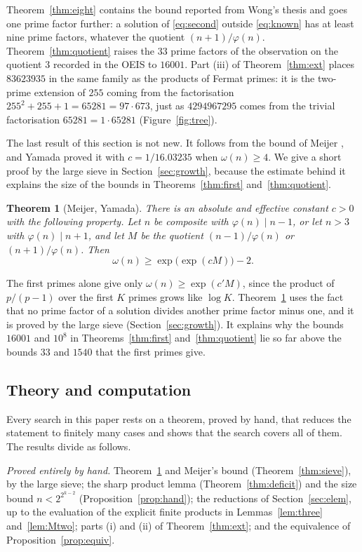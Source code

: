\documentclass[11pt,reqno]{amsart}
\numberwithin{equation}{section}
\theoremstyle{plain}
\newtheorem{theorem}{Theorem}[section]
\theoremstyle{definition}
\theoremstyle{remark}
\begin{document}
Theorem~\ref{thm:eight} contains the bound reported from Wong's
thesis and goes one prime factor further: a solution of
\eqref{eq:second} outside \eqref{eq:known} has at least nine prime
factors, whatever the quotient $(n+1)/\varphi(n)$. Theorem~\ref{thm:quotient}
raises the $33$ prime factors of the observation on the quotient $3$
recorded in the OEIS to $16001$. Part (iii) of
Theorem~\ref{thm:ext} places $83623935$ in the same family as the
products of Fermat primes: it is the two-prime extension of $255$
coming from the factorisation $255^2+255+1=65281=97\cdot673$, just as
$4294967295$ comes from the trivial factorisation $65281=1\cdot65281$
(Figure~\ref{fig:tree}).

The last result of this section is not new. It follows from the bound
of Meijer \cite{Mei74}, and Yamada \cite{Yam23} proved it with
$c=1/16.03235$ when $\omega(n)\ge4$. We give a short proof by the
large sieve in Section~\ref{sec:growth}, because the estimate behind it
explains the size of the bounds in Theorems~\ref{thm:first}
and~\ref{thm:quotient}.

\begin{theorem}[Meijer, Yamada]\label{thm:doubly}
There is an absolute and effective constant $c>0$ with the following
property. Let $n$ be composite with $\varphi(n)\mid n-1$, or let $n>3$
with $\varphi(n)\mid n+1$, and let $M$ be the quotient
$(n-1)/\varphi(n)$ or $(n+1)/\varphi(n)$. Then
\[
  \omega(n)\ge\exp\bigl(\exp(cM)\bigr)-2 .
\]
\end{theorem}

The first primes alone give only $\omega(n)\ge\exp(c'M)$, since the
product of $p/(p-1)$ over the first $K$ primes grows like $\log K$.
Theorem~\ref{thm:doubly} uses the fact that no prime factor of a
solution divides another prime factor minus one, and it is proved by
the large sieve (Section~\ref{sec:growth}). It explains why the bounds
$16001$ and $10^8$ in Theorems~\ref{thm:first} and~\ref{thm:quotient}
lie so far above the bounds $33$ and $1540$ that the first primes give.

\subsection{Theory and computation}
Every search in this paper rests on a theorem, proved by hand, that
reduces the statement to finitely many cases and shows that the search
covers all of them. The results divide as follows.

\emph{Proved entirely by hand.} Theorem~\ref{thm:doubly} and Meijer's
bound (Theorem~\ref{thm:sieve}), by the large sieve; the sharp product lemma
(Theorem~\ref{thm:deficit}) and the size bound $n<2^{2^{k-2}}$
(Proposition~\ref{prop:hand}); the reductions of
Section~\ref{sec:elem}, up to the evaluation of the explicit finite
products in Lemmas~\ref{lem:three} and~\ref{lem:Mtwo}; parts (i) and
(ii) of Theorem~\ref{thm:ext}; and the equivalence of
Proposition~\ref{prop:equiv}.
\end{document}
